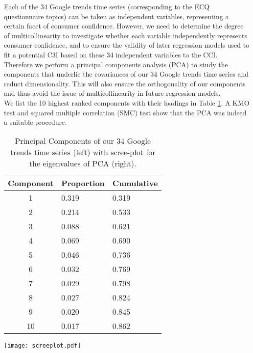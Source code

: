 \documentclass[10pt]{article}
\begin{document}
	Each of the 34 Google trends time series (corresponding to the ECQ questionnaire topics) can be taken as independent variables, 
	representing a certain facet of consumer confidence. However, we need to determine the degree of multicollinearity to investigate whether
	each variable independently represents consumer confidence, and to ensure the validity of later regression models used to fit
	a potential	 C3I based on these 34 independent variables to the CCI.\\
	
	Therefore we perform a principal components analysis (PCA) \cite{Hotelling1933} to study the components that underlie the covariances of 
	our 34 Google trends time series and reduct dimensionality. This will also ensure the orthogonality of our components and thus avoid the 
	issue of multicollinearity in 
	future regression models.\\
	
	We list the 10 highest ranked components with their loadings in Table \ref{ADFpars}. A KMO test \cite{Cureton1983} and 	
	squared multiple correlation (SMC) test\cite{Abdi2007} show that the PCA was  indeed a suitable procedure.\\
	
		\begin{table}[h!]
			\begin{minipage}[t]{.5\textwidth }
			\centering
			\vspace{0pt}
			\begin{tabular}{cll}
			\hline
			Component	&       Proportion	&	Cumulative	\\
			\hline
			1	        &       0.319              	&	0.319  \\
			2	        &       0.214	         &      0.533 \\
			3	        &       0.088	         &      0.621 \\
			4	        &       0.069	         &      0.690 \\
			5	        &       0.046	         &      0.736 \\
			6	        &       0.032	         &      0.769 \\
			7	        &       0.029	         &      0.798 \\
			8	        &       0.027	         &      0.824 \\
			9	        &       0.020	         &      0.845 \\
			10	        &       0.017	         &      0.862 \\
			\hline
			\end{tabular}
			\end{minipage}
			\begin{minipage}[t]{.5\textwidth }
			\centering
			\vspace{0pt}
			\texttt{[image: screeplot.pdf]}
\end{minipage}
			\caption{\label{ADFpars} Principal Components of our 34 Google trends time series (left) with scree-plot for the eigenvalues of PCA (right). }
	\end{table}
	
\end{document}
